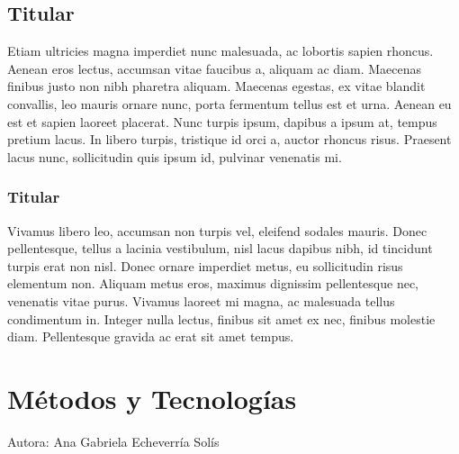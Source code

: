 \documentclass[
  letterpaper,
  DIV=11,
  numbers=noendperiod]{scrreprt}
\begin{document}
\hypertarget{titular-4}{%
\section{Titular}\label{titular-4}}

Etiam ultricies magna imperdiet nunc malesuada, ac lobortis sapien
rhoncus. Aenean eros lectus, accumsan vitae faucibus a, aliquam ac diam.
Maecenas finibus justo non nibh pharetra aliquam. Maecenas egestas, ex
vitae blandit convallis, leo mauris ornare nunc, porta fermentum tellus
est et urna. Aenean eu est et sapien laoreet placerat. Nunc turpis
ipsum, dapibus a ipsum at, tempus pretium lacus. In libero turpis,
tristique id orci a, auctor rhoncus risus. Praesent lacus nunc,
sollicitudin quis ipsum id, pulvinar venenatis mi.

\hypertarget{titular-5}{%
\subsection{Titular}\label{titular-5}}

Vivamus libero leo, accumsan non turpis vel, eleifend sodales mauris.
Donec pellentesque, tellus a lacinia vestibulum, nisl lacus dapibus
nibh, id tincidunt turpis erat non nisl. Donec ornare imperdiet metus,
eu sollicitudin risus elementum non. Aliquam metus eros, maximus
dignissim pellentesque nec, venenatis vitae purus. Vivamus laoreet mi
magna, ac malesuada tellus condimentum in. Integer nulla lectus, finibus
sit amet ex nec, finibus molestie diam. Pellentesque gravida ac erat sit
amet tempus.


\hypertarget{muxe9todos-y-tecnologuxedas}{%
\chapter{Métodos y Tecnologías}\label{muxe9todos-y-tecnologuxedas}}

Autora: Ana Gabriela Echeverría Solís
\end{document}
